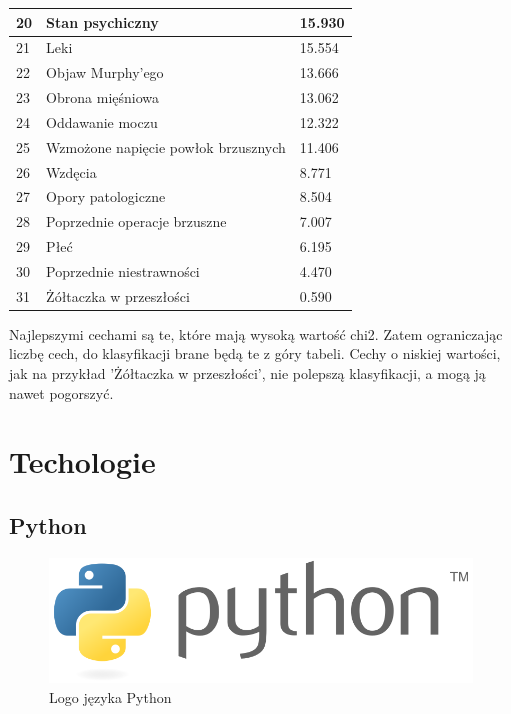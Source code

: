 \documentclass{report}
\begin{document}
\begin{tabular}{|l|l|l|}
        \hline 20 & Stan psychiczny & 15.930 \\
        \hline 21 & Leki & 15.554 \\
        \hline 22 & Objaw Murphy'ego & 13.666 \\
        \hline 23 & Obrona mięśniowa & 13.062 \\
        \hline 24 & Oddawanie moczu & 12.322 \\
        \hline 25 & Wzmożone napięcie powłok brzusznych & 11.406 \\
        \hline 26 & Wzdęcia & 8.771 \\
        \hline 27 & Opory patologiczne & 8.504 \\
        \hline 28 & Poprzednie operacje brzuszne & 7.007 \\
        \hline 29 & Płeć & 6.195 \\
        \hline 30 & Poprzednie niestrawności & 4.470 \\
        \hline 31 & Żółtaczka w przeszłości & 0.590 \\
        \hline

    \end{tabular}

    \vspace{1em}

    Najlepszymi cechami są te, które mają wysoką wartość chi2.
    Zatem ograniczając liczbę cech, do klasyfikacji brane będą te z góry tabeli.
    Cechy o niskiej wartości, jak na przykład 'Żółtaczka w przeszłości', nie polepszą klasyfikacji, a mogą ją nawet pogorszyć.

    \chapter{Techologie}

    \section{Python}

    \begin{figure}[h!]
        \centering
        \includegraphics[scale=0.4]{./img/python-logo.png}
        \caption{Logo języka Python}
    \end{figure}
\end{document}
